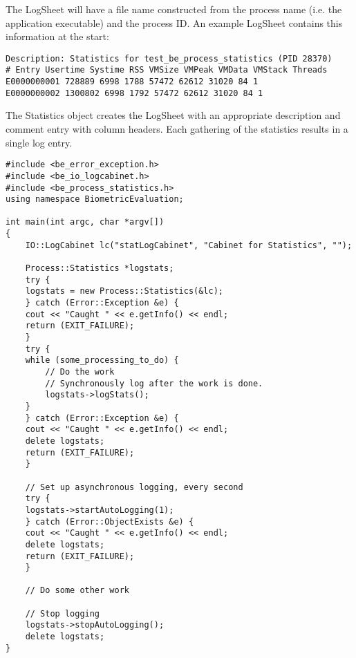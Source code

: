 The LogSheet will have a file name constructed from the process name (i.e.
the application executable) and the process ID. An example LogSheet contains
this information at the start:

\begin{verbatim}
Description: Statistics for test_be_process_statistics (PID 28370)
# Entry Usertime Systime RSS VMSize VMPeak VMData VMStack Threads
E0000000001 728889 6998 1788 57472 62612 31020 84 1
E0000000002 1300802 6998 1792 57472 62612 31020 84 1
\end{verbatim}

The Statistics object creates the LogSheet with an appropriate description
and comment entry with column headers. Each gathering of the statistics results
in a single log entry.

\begin{lstlisting}[caption={Logging Process Statistics}, label=processstatisticslogging]
#include <be_error_exception.h>
#include <be_io_logcabinet.h>
#include <be_process_statistics.h>
using namespace BiometricEvaluation;

int main(int argc, char *argv[])
{
    IO::LogCabinet lc("statLogCabinet", "Cabinet for Statistics", "");

    Process::Statistics *logstats;
    try {
	logstats = new Process::Statistics(&lc);
    } catch (Error::Exception &e) {
	cout << "Caught " << e.getInfo() << endl;
	return (EXIT_FAILURE);
    }
    try {
	while (some_processing_to_do) {
	    // Do the work
	    // Synchronously log after the work is done.
	    logstats->logStats();
	}
    } catch (Error::Exception &e) {
	cout << "Caught " << e.getInfo() << endl;
	delete logstats;
	return (EXIT_FAILURE);
    }

    // Set up asynchronous logging, every second
    try {
	logstats->startAutoLogging(1);
    } catch (Error::ObjectExists &e) {
	cout << "Caught " << e.getInfo() << endl;
	delete logstats;
	return (EXIT_FAILURE);
    }

    // Do some other work

    // Stop logging
    logstats->stopAutoLogging();
    delete logstats;
}
\end{lstlisting}
